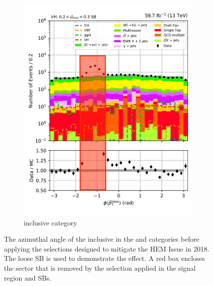 \begin{figure}[htbp]
\begin{subfigure}[b]{0.4\textwidth}
        \includegraphics[width=\textwidth]{figures/hem_issue/sideband_4/met_phi/met_phi_VH_before_annotated.pdf}
        \caption{\VH inclusive category}
    \end{subfigure}
    \caption[The azimuthal angle of the \ptvecmiss inclusive in the \ttH and \VH categories before applying the selections designed to mitigate the HEM Issue in 2018]{The azimuthal angle of the \ptvecmiss inclusive in the \ttH and \VH categories before applying the selections designed to mitigate the HEM Issue in 2018. The loose \omegaTilde \gls{SB} is used to demonstrate the effect. A red box encloses the sector that is removed by the selection applied in the signal region and \glspl{SB}.}
    \label{fig:htoinv_hem_issue_met_phi}
\end{figure}
